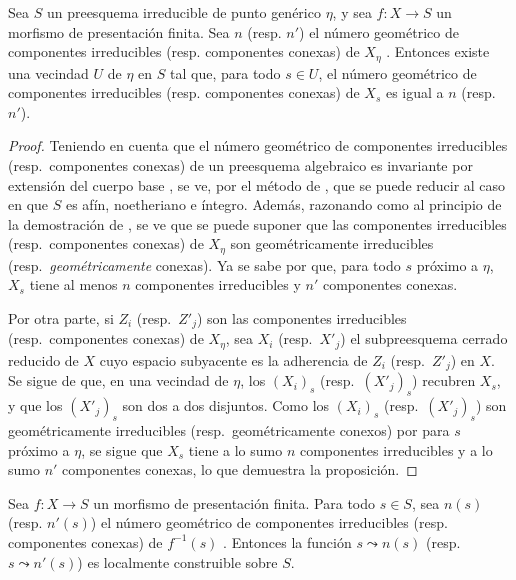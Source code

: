 \begin{proposition}[9.7.8]
\label{IV.9.7.8}
Sea $S$ un preesquema irreducible de punto genérico $\eta$, y sea $f:X\to S$ un morfismo de presentación finita. Sea $n$ \textup{(resp.} $n'$\textup{)} el número geométrico de componentes irreducibles \textup{(resp.} componentes conexas\textup{)} de $X_\eta$ . Entonces existe una vecindad $U$ de $\eta$ en $S$ tal que, para todo $s\in U$, el número geométrico de componentes irreducibles \textup{(resp.} componentes conexas\textup{)} de $X_s$ es igual a $n$ \textup{(resp.} $n'$\textup{)}.
\end{proposition}

\begin{proof}
Teniendo en cuenta que el número geométrico de componentes irreducibles (resp.\ componentes conexas) de un preesquema algebraico es invariante por extensión del cuerpo base , se ve, por el método de , que se puede reducir al caso en que $S$ es afín, noetheriano e íntegro. Además, razonando como al principio de la demostración de , se ve que se puede suponer que las componentes irreducibles (resp.\ componentes conexas) de $X_\eta$ son geométricamente irreducibles (resp.\ \emph{geométricamente} conexas). Ya se sabe por  que, para todo $s$ próximo a $\eta$, $X_s$ tiene al menos $n$ componentes irreducibles y $n'$ componentes conexas.

Por otra parte, si $Z_i$ (resp.\ $Z'_j$) son las componentes irreducibles (resp.\ componentes conexas) de $X_\eta$, sea $X_i$ (resp.\ $X'_j$) el subpreesquema cerrado reducido de $X$ cuyo espacio subyacente es la adherencia de $Z_i$ (resp.\ $Z'_j$) en $X$. Se sigue de  que, en una vecindad de $\eta$, los $(X_i)_s$ (resp.\ $(X'_j)_s$) recubren $X_s$, y que los $(X'_j)_s$ son dos a dos disjuntos. Como los $(X_i)_s$ (resp.\ $(X'_j)_s$) son geométricamente irreducibles (resp.\ geométricamente conexos) por  para $s$ próximo a $\eta$, se sigue que $X_s$ tiene a lo sumo $n$ componentes irreducibles y a lo sumo $n'$ componentes conexas, lo que demuestra la proposición.
\end{proof}

\begin{corollary}[9.7.9]
\label{IV.9.7.9}
Sea $f:X\to S$ un morfismo de presentación finita. Para todo $s\in S$, sea $n(s)$ \textup{(resp.} $n'(s)$\textup{)} el número geométrico de componentes irreducibles \textup{(resp.} componentes conexas\textup{)} de $f^{-1}(s)$ . Entonces la función $s\leadsto n(s)$ \textup{(resp.} $s\leadsto n'(s)$\textup{)} es localmente construible sobre $S$.
\end{corollary}


